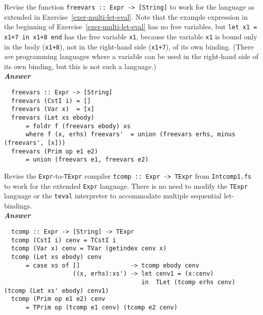 \documentclass[a4paper]{article}
\begin{document}
\begin{exercise}\label{exer-multi-let-closed}
  Revise the function \texttt{freevars ::\ Expr -> [String]} to work
  for the language as extended in Exercise~\ref{exer-multi-let-eval}.
  Note that the example expression in the beginning of
  Exercise~\ref{exer-multi-let-eval} has no free variables, but
  \texttt{let x1 = x1+7 in x1+8 end} has the free variable
  \texttt{x1}, because the variable \texttt{x1} is bound only in the
  body (\texttt{x1+8}), not in the right-hand side (\texttt{x1+7}), of
  its own binding.  (There \emph{are} programming languages where a
  variable can be used in the right-hand side of its own binding, but
  this is not such a language.)\\
  
\noindent
\textbf{\emph{Answer}}
{\codesetup\begin{verbatim}
  freevars :: Expr -> [String]
  freevars (CstI i) = []
  freevars (Var x)  = [x]
  freevars (Let xs ebody) 
      = foldr f (freevars ebody) xs 
      where f (x, erhs) freevars'  = union (freevars erhs, minus (freevars', [x]))
  freevars (Prim op e1 e2) 
      = union (freevars e1, freevars e2)
\end{verbatim}}
\end{exercise}


\begin{exercise}\label{exer-multi-let-tcomp}
  Revise the \texttt{Expr}-to-\texttt{TExpr} compiler \texttt{tcomp ::\ 
    Expr -> TExpr} from \texttt{Intcomp1.fs} to work for the extended
  \texttt{Expr} language.
  There is no need to modify the \texttt{TExpr} language or the
  \texttt{teval} interpreter to accommodate multiple sequential
  let-bindings.\\
  
  \noindent
\textbf{\emph{Answer}}
{\codesetup\begin{verbatim}
  tcomp :: Expr -> [String] -> TExpr 
  tcomp (CstI i) cenv = TCstI i
  tcomp (Var x) cenv = TVar (getindex cenv x)
  tcomp (Let xs ebody) cenv
      = case xs of []              -> tcomp ebody cenv 
                   ((x, erhs):xs') -> let cenv1 = (x:cenv)
                                      in  TLet (tcomp erhs cenv) (tcomp (Let xs' ebody) cenv1)
  tcomp (Prim op e1 e2) cenv
      = TPrim op (tcomp e1 cenv) (tcomp e2 cenv)
\end{verbatim}}
\end{exercise}
\end{document}
